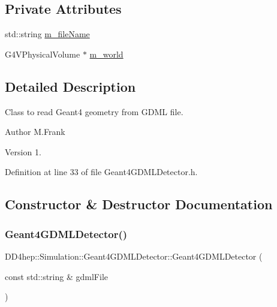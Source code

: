 \subsection*{Private Attributes}
\begin{DoxyCompactItemize}
\item 
std\+::string \hyperlink{class_d_d4hep_1_1_simulation_1_1_geant4_g_d_m_l_detector_a48ddc632f08c696ac90deb8c27eaf43a}{m\+\_\+file\+Name}
\item 
G4\+V\+Physical\+Volume $\ast$ \hyperlink{class_d_d4hep_1_1_simulation_1_1_geant4_g_d_m_l_detector_a26c0472c7321ec265414a1329ba5fdf3}{m\+\_\+world}
\end{DoxyCompactItemize}


\subsection{Detailed Description}
Class to read Geant4 geometry from G\+D\+ML file. 

\begin{DoxyAuthor}{Author}
M.\+Frank 
\end{DoxyAuthor}
\begin{DoxyVersion}{Version}
1. 
\end{DoxyVersion}


Definition at line 33 of file Geant4\+G\+D\+M\+L\+Detector.\+h.



\subsection{Constructor \& Destructor Documentation}
\hypertarget{class_d_d4hep_1_1_simulation_1_1_geant4_g_d_m_l_detector_a4bdf71880b0a663f8e2954eed4fc891d}{}\label{class_d_d4hep_1_1_simulation_1_1_geant4_g_d_m_l_detector_a4bdf71880b0a663f8e2954eed4fc891d} 
\subsubsection{\texorpdfstring{Geant4\+G\+D\+M\+L\+Detector()}{Geant4GDMLDetector()}}
{\footnotesize\ttfamily D\+D4hep\+::\+Simulation\+::\+Geant4\+G\+D\+M\+L\+Detector\+::\+Geant4\+G\+D\+M\+L\+Detector (\begin{DoxyParamCaption}\item[{const std\+::string \&}]{gdml\+File }\end{DoxyParamCaption})}



